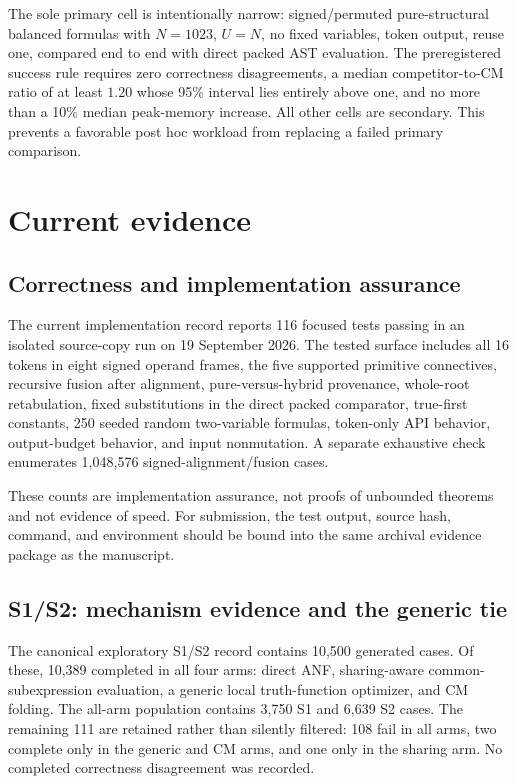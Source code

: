 \documentclass[10pt]{article}
\theoremstyle{plain}
\theoremstyle{definition}
\theoremstyle{remark}
\begin{document}
The sole primary cell is intentionally narrow: signed/permuted pure-structural balanced formulas with $N=1023$, $U=N$, no fixed variables, token output, reuse one, compared end to end with direct packed AST evaluation. The preregistered success rule requires zero correctness disagreements, a median competitor-to-CM ratio of at least $1.20$ whose 95\% interval lies entirely above one, and no more than a 10\% median peak-memory increase. All other cells are secondary. This prevents a favorable post hoc workload from replacing a failed primary comparison.

\section{Current evidence}
\label{sec:results}

\subsection{Correctness and implementation assurance}

The current implementation record reports 116 focused tests passing in an isolated source-copy run on 19 September 2026. The tested surface includes all 16 tokens in eight signed operand frames, the five supported primitive connectives, recursive fusion after alignment, pure-versus-hybrid provenance, whole-root retabulation, fixed substitutions in the direct packed comparator, true-first constants, 250 seeded random two-variable formulas, token-only API behavior, output-budget behavior, and input nonmutation. A separate exhaustive check enumerates 1,048,576 signed-alignment/fusion cases.

These counts are implementation assurance, not proofs of unbounded theorems and not evidence of speed. For submission, the test output, source hash, command, and environment should be bound into the same archival evidence package as the manuscript.

\subsection{S1/S2: mechanism evidence and the generic tie}

The canonical exploratory S1/S2 record contains 10,500 generated cases. Of these, 10,389 completed in all four arms: direct ANF, sharing-aware common-subexpression evaluation, a generic local truth-function optimizer, and CM folding. The all-arm population contains 3,750 S1 and 6,639 S2 cases. The remaining 111 are retained rather than silently filtered: 108 fail in all arms, two complete only in the generic and CM arms, and one only in the sharing arm. No completed correctness disagreement was recorded.
\end{document}
